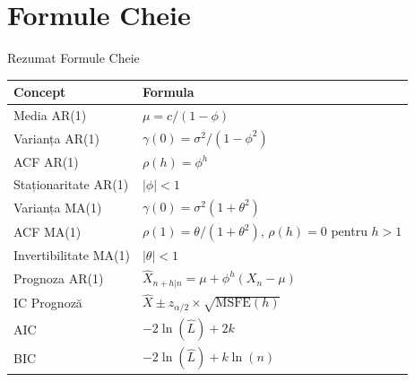 \documentclass[9pt, aspectratio=169, t]{beamer}
\begin{document}
\section{Formule Cheie}

\begin{frame}{Rezumat Formule Cheie}
    \small
    \begin{center}
    \begin{tabular}{ll}
        \toprule
        \textbf{Concept} & \textbf{Formula} \\
        \midrule
        Media AR(1) & $\mu = c/(1-\phi)$ \\[0.1cm]
        Varianța AR(1) & $\gamma(0) = \sigma^2/(1-\phi^2)$ \\[0.1cm]
        ACF AR(1) & $\rho(h) = \phi^h$ \\[0.1cm]
        Staționaritate AR(1) & $|\phi| < 1$ \\[0.1cm]
        \midrule
        Varianța MA(1) & $\gamma(0) = \sigma^2(1+\theta^2)$ \\[0.1cm]
        ACF MA(1) & $\rho(1) = \theta/(1+\theta^2)$, $\rho(h) = 0$ pentru $h > 1$ \\[0.1cm]
        Invertibilitate MA(1) & $|\theta| < 1$ \\[0.1cm]
        \midrule
        Prognoza AR(1) & $\hat{X}_{n+h|n} = \mu + \phi^h(X_n - \mu)$ \\[0.1cm]
        IC Prognoză & $\hat{X} \pm z_{\alpha/2} \times \sqrt{\text{MSFE}(h)}$ \\[0.1cm]
        \midrule
        AIC & $-2\ln(\hat{L}) + 2k$ \\[0.1cm]
        BIC & $-2\ln(\hat{L}) + k\ln(n)$ \\
        \bottomrule
    \end{tabular}
    \end{center}
\end{frame}
\end{document}
